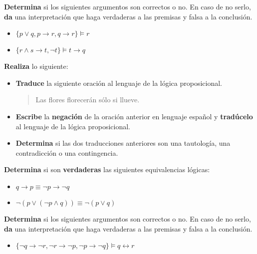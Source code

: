 \documentclass[oneside]{style}
\begin{document}
\begin{questions}[label=\protect\circled{\bfseries\arabic*}]
    \question
    {
        \textbf{Determina} si los siguientes argumentos son correctos o no. En 
        caso de no serlo, \textbf{da} una interpretación que haga verdaderas a 
        las premisas y falsa a la conclusión. 
        \begin{itemize}
            \item $\{p \lor q, p \rightarrow r, q \rightarrow r\} \models r$

            \item $\{r \land s \rightarrow t, \neg t\} \models t \rightarrow q$
        \end{itemize}
    }

    \question
    {
        \textbf{Realiza} lo siguiente:
        \begin{itemize}
            \item \textbf{Traduce} la siguiente oración al lenguaje de la 
            lógica proposicional. 

            \begin{quote}
                \centering
                Las flores florecerán sólo si llueve.  
            \end{quote}

            \item \textbf{Escribe} la \textbf{negación} de la oración anterior 
            en lenguaje español y \textbf{tradúcelo} al lenguaje de la lógica 
            proposicional.

            \item \textbf{Determina} si las dos traducciones anteriores son 
            una tautología, una contradicción o una contingencia. 
        \end{itemize}
    }

    \question
    {
        \textbf{Determina} si son \textbf{verdaderas} las siguientes 
        equivalencias lógicas:
        \begin{itemize}
            \item $q \rightarrow p \equiv \neg p \rightarrow \neg q$

            \item $\neg (p \lor (\neg p \land q)) \equiv \neg (p \lor q)$
        \end{itemize}
    }

    \question
    {
        \textbf{Determina} si los siguientes argumentos son correctos o no. En 
        caso de no serlo, \textbf{da} una interpretación que haga verdaderas a 
        las premisas y falsa a la conclusión. 
        \begin{itemize}
            \item $\{\neg q \rightarrow \neg r, \neg r \rightarrow \neg p, 
            \neg p \rightarrow \neg q\} \models q \leftrightarrow r$


\end{itemize}}
\end{questions}
\end{document}
